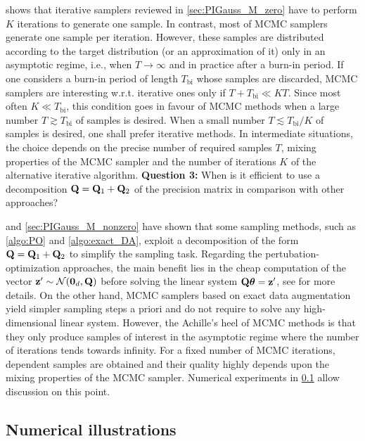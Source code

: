 \documentclass[nohypdvips,onefignum,onetabnum]{siamart171218}
\begin{document}
 shows that iterative samplers reviewed in \cref{sec:PIGauss_M_zero} have to perform $K$ iterations to generate one sample. 
In contrast, most of MCMC samplers generate one sample per iteration. However, these samples are distributed according to the target distribution (or an approximation of it) only in an asymptotic regime, i.e., when $T \rightarrow \infty$ and in practice after a burn-in period. 
If one considers a burn-in period of length $T_{\mathrm{bi}}$ whose samples are discarded, MCMC samplers are interesting w.r.t. iterative ones only if $T + T_{\mathrm{bi}} \ll KT$.
Since most often $K\ll T_{\mathrm{bi}}$,
this condition goes in favour of MCMC methods when a large number $T\gtrsim T_{\mathrm{bi}}$ of samples is desired. When a small number $T\lesssim T_{\mathrm{bi}}/K$  of samples is desired, one shall prefer iterative methods. 
%
In intermediate situations, the choice depends on the precise number of required samples $T$, mixing properties of the MCMC sampler and the number of iterations $K$ of the alternative iterative algorithm. \vspace{0.25cm}
\noindent\textbf{Question 3:} When is it efficient to use a decomposition $\mathbf{Q} = \mathbf{Q}_1 + \mathbf{Q}_2$ of the precision matrix in comparison with other approaches?\vspace{0.25cm}

 and \cref{sec:PIGauss_M_nonzero} have shown that some sampling methods, such as \cref{algo:PO} and \cref{algo:exact_DA}, exploit a decomposition of the form $\mathbf{Q} = \mathbf{Q}_1 + \mathbf{Q}_2$ to simplify the sampling task.
Regarding the pertubation-optimization approaches, the main benefit lies in the cheap computation of the vector $\mathbf{z}' \sim \mathcal{N}(\mathbf{0}_d,\mathbf{Q})$ before solving the linear system $\mathbf{Q}\boldsymbol{\theta} = \mathbf{z}'$, see \cite{Papandreou2011} for more details. On the other hand, MCMC samplers based on exact data augmentation yield simpler sampling steps a priori and do not require to solve any high-dimensional linear system. 
However, the Achille's heel of MCMC methods is that they only produce samples of interest in the asymptotic regime where the number of iterations tends towards infinity.
For a fixed number of MCMC iterations, dependent samples are obtained and their quality highly depends upon the mixing properties of the MCMC sampler. 
Numerical experiments in \cref{subsec:results} allow discussion on this point.


\subsection{Numerical illustrations}
\label{subsec:results}
\end{document}
